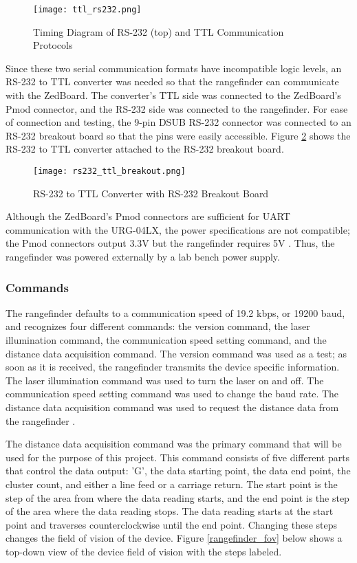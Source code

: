 \begin{figure}[H]
	\centerline{\texttt{[image: ttl\_rs232.png]}}
	\caption{Timing Diagram of RS-232 (top) and TTL Communication Protocols \cite{ttl}}
	\label{ttl_rs232_pic}
\end{figure}

Since these two serial communication formats have incompatible logic levels, an RS-232 to TTL converter was needed so that the rangefinder can communicate with the ZedBoard. The converter's TTL side was connected to the ZedBoard's Pmod connector, and the RS-232 side was connected to the rangefinder. For ease of connection and testing, the 9-pin DSUB RS-232 connector was connected to an RS-232 breakout board so that the pins were easily accessible. Figure \ref{rs232_ttl_breakout} shows the RS-232 to TTL converter attached to the RS-232 breakout board.

\begin{figure}[H]
	\centerline{\texttt{[image: rs232\_ttl\_breakout.png]}}
	\caption{RS-232 to TTL Converter with RS-232 Breakout Board}
	\label{rs232_ttl_breakout}
\end{figure}

Although the ZedBoard's Pmod connectors are sufficient for UART communication with the URG-04LX, the power specifications are not compatible; the Pmod connectors output 3.3V but the rangefinder requires 5V \cite{zedboard_datasheet, urg04lx_specifications}. Thus, the rangefinder was powered externally by a lab bench power supply.

\subsubsection{Commands}
The rangefinder defaults to a communication speed of 19.2 kbps, or 19200 baud, and recognizes four different commands: the version command, the laser illumination command, the communication speed setting command, and the distance data acquisition command. The version command was used as a test; as soon as it is received, the rangefinder transmits the device specific information. The laser illumination command was used to turn the laser on and off. The communication speed setting command was used to change the baud rate. The distance data acquisition command was used to request the distance data from the rangefinder \cite{urg04lx_datasheet}.
\par
The distance data acquisition command was the primary command that will be used for the purpose of this project. This command consists of five different parts that control the data output: 'G', the data starting point, the data end point, the cluster count, and either a line feed or a carriage return. The start point is the step of the area from where the data reading starts, and the end point is the step of the area where the data reading stops. The data reading starts at the start point and traverses counterclockwise until the end point. Changing these steps changes the field of vision of the device. Figure \ref{rangefinder_fov} below shows a top-down view of the device field of vision with the steps labeled.

